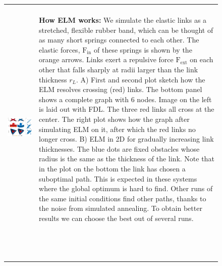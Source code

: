 \documentclass[nofootinbib,preprint,floatfix,endfloats]{revtex4} %
\begin{document}
\begin{figure}
\begin{tabular}{ll}
\begin{minipage}{.3\textwidth}
\begin{spacing}{.5}
        \end{spacing}
          \end{minipage}
         \\
         \begin{minipage}{.7\columnwidth}
    \includegraphics[width = \columnwidth]{fig-09-19/elf-resolve-2d-1.png}
    \end{minipage}
         & 
         \begin{minipage}{.3\columnwidth}
         \raggedright
         \begin{spacing}{.5}
         {\scriptsize{\bf How ELM works:} We simulate the elastic links as a stretched, flexible rubber band, which can be thought of as many short springs connected to each other. The elastic forces, $\mathrm{F}_{\mathrm{in}}$ of these springs is shown by the orange arrows. Links exert a repulsive force $\mathrm{F}_{\mathrm{ext}}$  on each other that falls sharply at radii larger than the link thickness $r_L$. A) First and second plot sketch how the ELM resolves crossing (red) links. The bottom panel shows a complete graph with 6 nodes. Image on the left is laid out with FDL. The three red links all cross at the center. The right plot shows how the graph after simulating ELM on it, after which the red links no longer cross. B) ELM in 2D for gradually increasing link thicknesses. The blue dots are fixed obstacles whose radius is the same as the thickness of the link. Note that in the plot on the bottom the link has chosen a suboptimal path. This is  expected in these systems where the global optimum is hard to find. Other runs of the same initial conditions find other paths, thanks to the noise from simulated annealing. To obtain better results we can choose the best out of several runs.}
         
        \end{spacing}
    \end{minipage}
    ~\\~\bigskip
    \end{tabular}
    \label{fig:crossings}
\end{figure}
\end{document}
